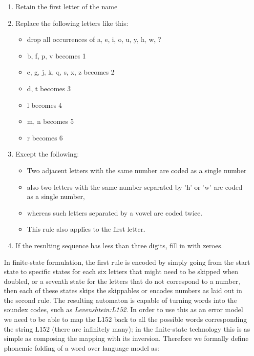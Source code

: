 \documentclass[a4paper,12pt]{article}
\begin{document}
\begin{enumerate}
    \item Retain the first letter of the name
    \item Replace the following letters like this:\begin{itemize}
            \item drop all occurrences of a, e, i, o, u, y, h, w, ?
            \item b, f, p, v becomes 1
            \item c, g, j, k, q, s, x, z becomes 2
            \item d, t becomes 3
            \item l becomes 4
            \item m, n becomes 5
            \item r becomes 6
        \end{itemize}
    \item Except the following:\begin{itemize}
            \item Two adjacent letters with the same number are coded as a
                single number
            \item also two letters with the same number separated by 'h' or 'w'
                are coded as a single number,
            \item whereas such letters separated by a vowel are coded twice.
            \item This rule also applies to the first letter.
        \end{itemize}
    \item If the resulting sequence has less than three digits, fill in with
        zeroes.
\end{enumerate}

In finite-state formulation, the first rule is encoded by
simply going from the start state to specific states for each six letters that
might need to be skipped when doubled, or a seventh state for the letters that
do not correspond to a number, then each of these states skips the skippables
or encodes numbers as laid out in the second rule. The resulting automaton is
capable of turning words into the soundex codes, such as
\emph{Levenshtein:L152}. In order to use this as an error model we need to be
able to map the L152 back to all the possible words corresponding the string
L152 (there are infinitely many); in the finite-state technology this is as
simple as composing the mapping with its inversion. Therefore we formally
define phonemic folding of a word over language model as:
\end{document}
